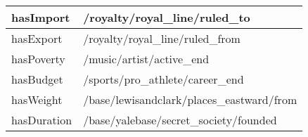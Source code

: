 \begin{table}[htbp]
\begin{tabular}{|l|l|}
    hasImport  & /royalty/royal\_line/ruled\_to \\
    \hline
    hasExport  & /royalty/royal\_line/ruled\_from \\
    \hline
    hasPoverty  & /music/artist/active\_end \\
    \hline
    hasBudget  & /sports/pro\_athlete/career\_end \\
    \hline
    hasWeight  & /base/lewisandclark/places\_eastward/from \\
    \hline
    hasDuration  & /base/yalebase/secret\_society/founded \\
    \hline
    \end{tabular}%
  \label{tab:addlabel-attr}%
\end{table}%




